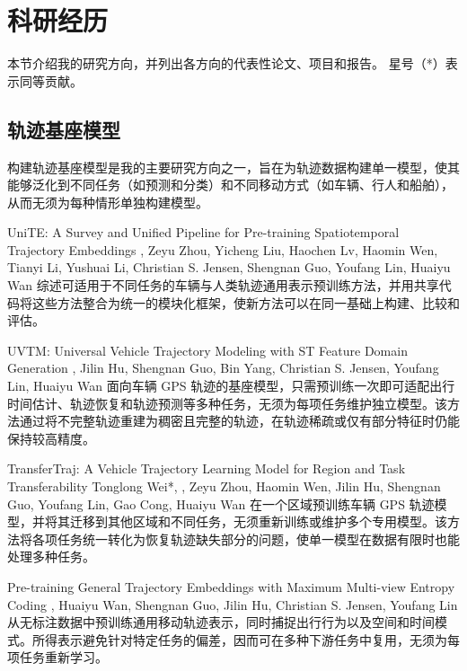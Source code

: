 \section*{科研经历}
本节介绍我的研究方向，并列出各方向的代表性论文、项目和报告。
星号（*）表示同等贡献。
\listsnote

\subsection*{轨迹基座模型}
构建轨迹基座模型是我的主要研究方向之一，旨在为轨迹数据构建单一模型，使其能够泛化到不同任务（如预测和分类）和不同移动方式（如车辆、行人和船舶），从而无须为每种情形单独构建模型。

{UniTE: A Survey and Unified Pipeline for Pre-training Spatiotemporal Trajectory Embeddings}
{\me, Zeyu Zhou, Yicheng Liu, Haochen Lv, Haomin Wen, Tianyi Li, Yushuai Li, Christian S. Jensen, Shengnan Guo, Youfang Lin, Huaiyu Wan}
{综述可适用于不同任务的车辆与人类轨迹通用表示预训练方法，并用共享代码将这些方法整合为统一的模块化框架，使新方法可以在同一基础上构建、比较和评估。}

{UVTM: Universal Vehicle Trajectory Modeling with ST Feature Domain Generation}
{\me, Jilin Hu, Shengnan Guo, Bin Yang, Christian S. Jensen, Youfang Lin, Huaiyu Wan}
{面向车辆 GPS 轨迹的基座模型，只需预训练一次即可适配出行时间估计、轨迹恢复和轨迹预测等多种任务，无须为每项任务维护独立模型。该方法通过将不完整轨迹重建为稠密且完整的轨迹，在轨迹稀疏或仅有部分特征时仍能保持较高精度。}

{TransferTraj: A Vehicle Trajectory Learning Model for Region and Task Transferability}
{Tonglong Wei*, \me*, Zeyu Zhou, Haomin Wen, Jilin Hu, Shengnan Guo, Youfang Lin, Gao Cong, Huaiyu Wan}
{在一个区域预训练车辆 GPS 轨迹模型，并将其迁移到其他区域和不同任务，无须重新训练或维护多个专用模型。该方法将各项任务统一转化为恢复轨迹缺失部分的问题，使单一模型在数据有限时也能处理多种任务。}

{Pre-training General Trajectory Embeddings with Maximum Multi-view Entropy Coding}
{\me, Huaiyu Wan, Shengnan Guo, Jilin Hu, Christian S. Jensen, Youfang Lin}
{从无标注数据中预训练通用移动轨迹表示，同时捕捉出行行为以及空间和时间模式。所得表示避免针对特定任务的偏差，因而可在多种下游任务中复用，无须为每项任务重新学习。}

